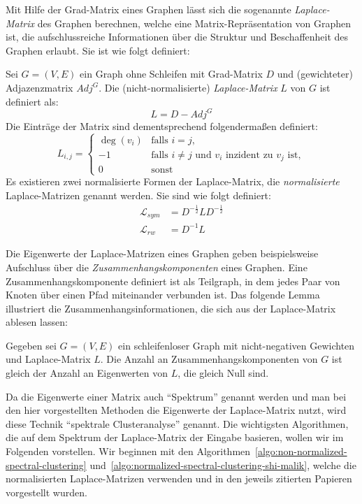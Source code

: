 Mit Hilfe der Grad-Matrix eines Graphen lässt sich die sogenannte \emph{Laplace-Matrix} des Graphen berechnen, welche eine
Matrix-Repräsentation von Graphen ist, die aufschlussreiche Informationen über die Struktur und Beschaffenheit des Graphen
erlaubt. Sie ist wie folgt definiert:

\begin{definition}
\label{def:laplace-matrix}
	Sei $G=(V,E)$ ein Graph ohne Schleifen mit Grad-Matrix $D$ und (gewichteter) Adjazenzmatrix $Adj^G$.
	Die (nicht-normalisierte) \emph{Laplace-Matrix} $L$ von $G$ ist definiert als:
	\[ L = D - Adj^G \]
	Die Einträge der Matrix sind dementsprechend folgendermaßen definiert:
	\[ L_{i,j} = 	\begin{cases}
						\deg(v_i) & \textrm{falls } i = j, \\
						-1 & \textrm{falls } i \neq j \textrm{ und $v_i$ inzident zu $v_j$ ist}, \\
						0 & \textrm{sonst}
					\end{cases}
	\]
	Es existieren zwei normalisierte Formen der Laplace-Matrix, die \emph{normalisierte} Laplace-Matrizen genannt werden.
	Sie sind wie folgt definiert:
	\begin{align*}
		\mathcal{L}_{sym} &= D^{-\frac{1}{2}} L D^{-\frac{1}{2}} \\
		\mathcal{L}_{rw} &= D^{-1} L
	\end{align*}
\end{definition}
Die Eigenwerte der Laplace-Matrizen eines Graphen geben beispielsweise Aufschluss über die \emph{Zusammenhangskomponenten} eines
Graphen. Eine Zusammenhangskomponente definiert ist als Teilgraph, in dem jedes Paar von Knoten über einen Pfad
miteinander verbunden ist. Das folgende Lemma illustriert die Zusammenhangsinformationen, die sich aus der Laplace-Matrix
ablesen lassen:

\begin{lemma}
\label{lemma:connectivity-laplace-spectrum}
	Gegeben sei $G=(V,E)$ ein schleifenloser Graph mit nicht-negativen Gewichten und Laplace-Matrix $L$. Die Anzahl an
	Zusammenhangskomponenten von $G$ ist gleich der Anzahl an Eigenwerten von $L$, die gleich Null sind.
\end{lemma}
Da die Eigenwerte einer Matrix auch "`Spektrum"' genannt werden und man bei den hier vorgestellten Methoden die Eigenwerte
der Laplace-Matrix nutzt, wird diese Technik "`spektrale Clusteranalyse"' genannt.
\absatz
Die wichtigsten Algorithmen, die auf dem Spektrum der Laplace-Matrix der Eingabe basieren, wollen wir im Folgenden vorstellen.
Wir beginnen mit den Algorithmen~\ref{algo:non-normalized-spectral-clustering}
und~\ref{algo:normalized-spectral-clustering-shi-malik}, welche die normalisierten Laplace-Matrizen verwenden und
in den jeweils zitierten Papieren vorgestellt wurden.

